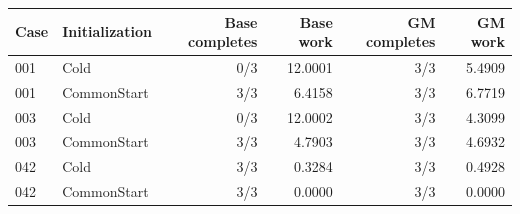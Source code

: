 \begin{tabular}{llrrrr}
\toprule
Case & Initialization & Base completes & Base work & GM completes & GM work \\
\midrule
001 & Cold & 0/3 & 12.0001 & 3/3 & 5.4909 \\
001 & CommonStart & 3/3 & 6.4158 & 3/3 & 6.7719 \\
003 & Cold & 0/3 & 12.0002 & 3/3 & 4.3099 \\
003 & CommonStart & 3/3 & 4.7903 & 3/3 & 4.6932 \\
042 & Cold & 3/3 & 0.3284 & 3/3 & 0.4928 \\
042 & CommonStart & 3/3 & 0.0000 & 3/3 & 0.0000 \\
\bottomrule
\end{tabular}

